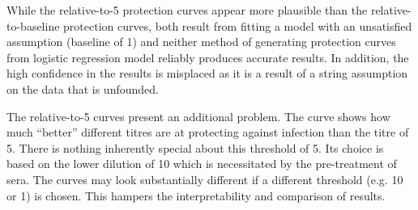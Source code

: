 While the relative-to-5 protection curves appear more plausible than the relative-to-baseline protection curves, both result from fitting a model with an unsatisfied assumption (baseline of 1) and neither method of generating protection curves from logistic regression model reliably produces accurate results. In addition, the high confidence in the results is misplaced as it is a result of a string assumption on the data that is unfounded.

The relative-to-5 curves present an additional problem. The curve shows how much ``better'' different titres are at protecting against infection than the titre of 5.
There is nothing inherently special about this threshold of 5. Its choice is based on the lower dilution of 10 which is necessitated by the pre-treatment of sera. The curves may look substantially different if a different threshold (e.g. 10 or 1) is chosen. This hampers the interpretability and comparison of results.
